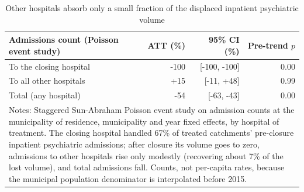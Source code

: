 \begin{table}[!htbp]\centering
\caption{Other hospitals absorb only a small fraction of the displaced inpatient psychiatric volume}
\label{tab:other-hosp-es}
\small
\begin{tabular}{lrrr}
\toprule
Admissions count (Poisson event study) & ATT (\%) & 95\% CI (\%) & Pre-trend $p$ \\
\midrule
To the closing hospital & -100 & [-100, -100] & 0.00 \\
To all other hospitals & +15 & [-11, +48] & 0.99 \\
Total (any hospital) & -54 & [-63, -43] & 0.00 \\
\bottomrule
\multicolumn{4}{p{0.92\textwidth}}{\footnotesize Notes: Staggered Sun-Abraham Poisson event study on admission counts at the municipality of residence, municipality and year fixed effects, by hospital of treatment. The closing hospital handled 67\% of treated catchments' pre-closure inpatient psychiatric admissions; after closure its volume goes to zero, admissions to other hospitals rise only modestly (recovering about 7\% of the lost volume), and total admissions fall. Counts, not per-capita rates, because the municipal population denominator is interpolated before 2015.}\\
\end{tabular}
\end{table}

